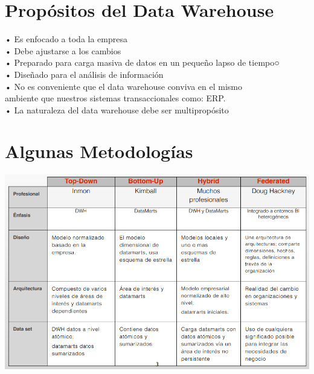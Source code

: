 \section{Propósitos del Data Warehouse}
•	Es enfocado a toda la empresa\\
•	Debe ajustarse a los cambios\\
•	Preparado para carga masiva de datos en un pequeño lapso de tiempo○\\
•	Diseñado para el análisis de información\\
•	No es conveniente que el data warehouse conviva en el mismo\\ ambiente que nuestros sistemas transaccionales como: ERP.\\
•	La naturaleza del data warehouse debe ser multipropósito\\

\section{Algunas Metodologías}

\begin{center}
\includegraphics[width=16cm]{./Imagenes/image009}
\end{center}
\newpage
